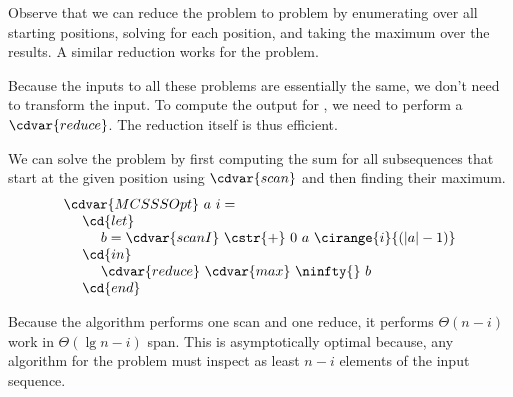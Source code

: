 \begin{gram}
Observe that we can reduce the \MCSS{} problem to \MCSSS{} problem by
enumerating over all starting positions, solving \MCSSS{} for each
position, and taking the maximum over the results.
%
A similar reduction works for the \MCSSE{} problem.

Because the inputs to all these problems are essentially the same, we
don't need to transform the input.  To compute the output for \MCSS{},
we need to perform a $\cdvar{reduce}$.
%
The reduction itself is thus efficient.
\end{gram}


\begin{algorithm}
\label{alg:mcss::reduction::mcsss}
We can solve the \MCSSS{} problem by first computing the sum for all
subsequences that start at the given position using $\cdvar{scan}$ and then finding
their maximum.
%
\[
\begin{array}{l}
\cdvar{MCSSSOpt}~a~i =
\\ 
~~~~\cd{let} 
\\ 
~~~~~~~~b = \cdvar{scanI}~\cstr{+}~0~a~\cirange{i}{(|a|-1)}
\\ 
~~~~\cd{in}
\\ 
~~~~~~~~\cdvar{reduce}~\cdvar{max}~\ninfty{}~b
\\ 
~~~~\cd{end}
\end{array}
\]

Because the algorithm performs one scan and one reduce, it performs
$\Theta(n-i)$ work in $\Theta(\lg{n-i})$ span.  This is asymptotically
optimal because, any algorithm for the \MCSSS{} problem must inspect
as least $n-i$ elements of the input sequence.

\end{algorithm}
%



